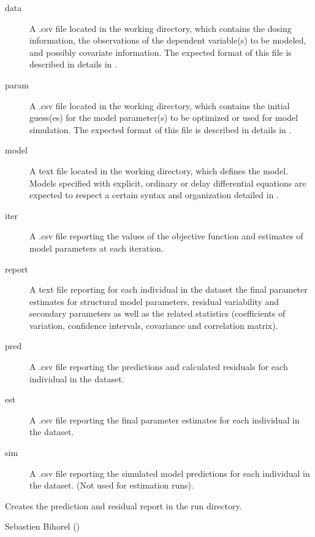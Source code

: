 \begin{Arguments}
\begin{ldescription}
\begin{description}
\item[data] A .csv file located in the working directory, which contains
the dosing information, the observations of the dependent variable(s)
to be modeled, and possibly covariate information. The expected format 
of this file is described in details in .
\item[param] A .csv file located in the working directory, which contains
the initial guess(es) for the model parameter(s) to be optimized or used
for model simulation. The expected format of this file is described in
details in .
\item[model] A text file located in the working directory, which defines 
the model. Models specified with explicit, ordinary or delay 
differential equations are expected to respect a certain syntax and 
organization detailed in .
\item[iter] A .csv file reporting the values of the objective function
and estimates of model parameters at each iteration.
\item[report] A text file reporting for each individual in the dataset the
final parameter estimates for structural model parameters, residual 
variability and secondary parameters as well as the related statistics 
(coefficients of variation, confidence intervals, covariance and 
correlation matrix).
\item[pred] A .csv file reporting the predictions and calculated residuals
for each individual in the dataset.
\item[est] A .csv file reporting the final parameter estimates for each
individual in the dataset.
\item[sim] A .csv file reporting the simulated model predictions for each 
individual in the dataset. (Not used for estimation runs).

\end{description}


\end{ldescription}
\end{Arguments}
%
\begin{Value}
Creates the prediction and residual report in the run directory.
\end{Value}
%
\begin{Author}\relax
Sebastien Bihorel ()
\end{Author}
